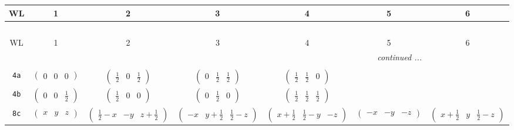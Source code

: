 \documentclass[fleqn,9pt,landscape]{jsarticle}
\begin{document}
\begin{center}
\renewcommand{\arraystretch}{1.2}
\begin{longtable}{ccccccc}
 \hline \hline
WL & 1 & 2 & 3 & 4 & 5 & 6 \\ \hline \endfirsthead

\multicolumn{6}{l}{\tablename\ \thetable{}} \\
 \hline \hline
WL & 1 & 2 & 3 & 4 & 5 & 6 \\ \hline \endhead

 \hline \hline
\multicolumn{6}{r}{\footnotesize\it continued ...} \\ \endfoot

 \hline \hline
\multicolumn{6}{r}{} \\ \endlastfoot

{\tt 4a} & $ \begin{pmatrix} 0 & 0 & 0 \end{pmatrix} $ & $ \begin{pmatrix} \frac{1}{2} & 0 & \frac{1}{2} \end{pmatrix} $ & $ \begin{pmatrix} 0 & \frac{1}{2} & \frac{1}{2} \end{pmatrix} $ & $ \begin{pmatrix} \frac{1}{2} & \frac{1}{2} & 0 \end{pmatrix} $ & $  $ & $  $ \\ \hline
{\tt 4b} & $ \begin{pmatrix} 0 & 0 & \frac{1}{2} \end{pmatrix} $ & $ \begin{pmatrix} \frac{1}{2} & 0 & 0 \end{pmatrix} $ & $ \begin{pmatrix} 0 & \frac{1}{2} & 0 \end{pmatrix} $ & $ \begin{pmatrix} \frac{1}{2} & \frac{1}{2} & \frac{1}{2} \end{pmatrix} $ & $  $ & $  $ \\ \hline
{\tt 8c} & $ \begin{pmatrix} x & y & z \end{pmatrix} $ & $ \begin{pmatrix} \frac{1}{2} - x & - y & z + \frac{1}{2} \end{pmatrix} $ & $ \begin{pmatrix} - x & y + \frac{1}{2} & \frac{1}{2} - z \end{pmatrix} $ & $ \begin{pmatrix} x + \frac{1}{2} & \frac{1}{2} - y & - z \end{pmatrix} $ & $ \begin{pmatrix} - x & - y & - z \end{pmatrix} $ & $ \begin{pmatrix} x + \frac{1}{2} & y & \frac{1}{2} - z \end{pmatrix} $ \\

\end{longtable}
\end{center}
\end{document}
